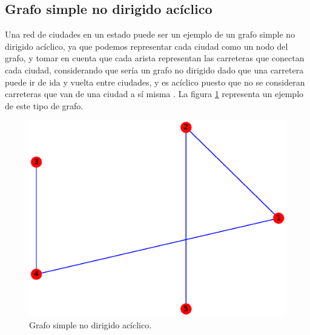 \documentclass{article}
\begin{document}
\subsection{Grafo simple no dirigido acíclico}
Una red de ciudades en un estado puede ser un ejemplo de un grafo simple no dirigido acíclico, ya que podemos representar cada ciudad como un nodo del grafo, y tomar en cuenta que cada arista representan las carreteras que conectan cada ciudad, considerando que sería un grafo no dirigido dado que una carretera puede ir de ida y vuelta entre ciudades, y es acíclico puesto que no se consideran carreteras que van de una ciudad a sí misma \cite{novo2004aplicaciones}. La figura \ref{fig:GSNDA} representa un ejemplo de este tipo de grafo.

\begin{figure}[H]
    \includegraphics[width=\textwidth]{1-GSNDA}
    \caption{Grafo simple no dirigido acíclico.}
    \label{fig:GSNDA}
\end{figure}
\end{document}

